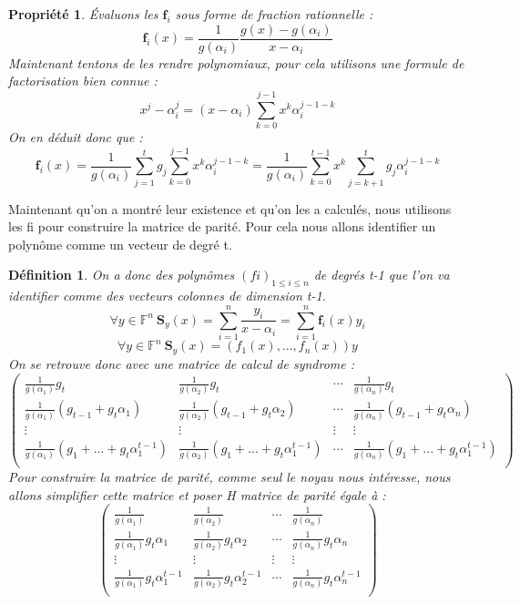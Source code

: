\documentclass{article}
\newtheorem{prop}{Propriété}
\newtheorem{defi}{Définition}
\begin{document}
		\begin{prop}
			Évaluons les  $ \mathbf{f}_{i} $  sous forme de fraction rationnelle :
			$$ \mathbf{f}_{i}(x) = \frac{1}{g(\alpha_{i})} \frac{g(x)-g(\alpha_{i})}{x-\alpha_{i}}  $$ 
			Maintenant tentons de les rendre polynomiaux, pour cela utilisons une formule de factorisation bien connue  :
			$$ x^{j} - \alpha_{i}^{j} = (x-\alpha_{i})\sum_{k=0}^{j-1} x^{k}\alpha_{i}^{j-1-k}$$
			On en déduit donc que :
			$$  \mathbf{f}_{i}(x) = \frac{1}{g(\alpha_{i})} \sum_{j=1}^{t} g_{j}\sum_{k=0}^{j-1} x^{k}\alpha_{i}^{j-1-k} 
			= \frac{1}{g(\alpha_{i})} \sum_{k=0}^{t-1} x^{k}\sum_{j=k+1}^{t} g_{j}\alpha_{i}^{j-1-k}$$
		\end{prop}

		Maintenant qu'on a montré leur existence et qu'on les a calculés, nous utilisons les fi pour construire la matrice de parité.
		Pour cela nous allons identifier un polynôme comme un vecteur de degré t.

		\begin{defi}
			On a donc des polynômes $(fi)_{1\leq i \leq n}$ de degrés t-1 que l'on va identifier comme des vecteurs colonnes de dimension t-1.
			$$ \forall y \in \mathbb{F}^{n} \ \mathbf{S}_{y}(x) = \sum_{i=1}^{n} \frac{y_{i}}{x-\alpha_{i}} = \sum_{i=1}^{n} \mathbf{f}_{i}(x)y_{i}$$
			$$ \forall y \in \mathbb{F}^{n} \  \mathbf{S}_{y}(x) =(f_{1}(x), ... , f_{n}(x))y $$
			On se retrouve donc avec une matrice de calcul de syndrome :
			$$ 
			\begin{pmatrix}
				\frac{1}{g(\alpha_{1})}g_{t} &  \frac{1}{g(\alpha_{2})}g_{t} & \cdots &  \frac{1}{g(\alpha_{n})}g_{t} \\
				\frac{1}{g(\alpha_{1})}(g_{t-1} + g_{t}\alpha_{1}) &  \frac{1}{g(\alpha_{2})}(g_{t-1} + g_{t}\alpha_{2}) & \cdots &  \frac{1}{g(\alpha_{n})}(g_{t-1} + g_{t}\alpha_{n}) \\
				\vdots & \vdots & \vdots & \vdots\\
				\frac{1}{g(\alpha_{1})}(g_{1} + ... +g_{t}\alpha_{1}^{t-1}) &  \frac{1}{g(\alpha_{2})}(g_{1} + ... +g_{t}\alpha_{1}^{t-1}) & \cdots &  \frac{1}{g(\alpha_{n})}(g_{1} + ... +g_{t}\alpha_{1}^{t-1}) \\
			\end{pmatrix}
			$$
			Pour construire la matrice de parité, comme seul le noyau nous intéresse, nous allons simplifier cette matrice et poser H matrice de parité égale à :
			$$
			\begin{pmatrix}
				\frac{1}{g(\alpha_{1})} &  \frac{1}{g(\alpha_{2})} & \cdots &  \frac{1}{g(\alpha_{n})} \\
				\frac{1}{g(\alpha_{1})}g_{t}\alpha_{1} &  \frac{1}{g(\alpha_{2})}g_{t}\alpha_{2} & \cdots &  \frac{1}{g(\alpha_{n})}g_{t}\alpha_{n}\\
				\vdots & \vdots & \vdots & \vdots\\
				\frac{1}{g(\alpha_{1})}g_{t}\alpha_{1}^{t-1} &  \frac{1}{g(\alpha_{2})}g_{t}\alpha_{2}^{t-1} & \cdots &  \frac{1}{g(\alpha_{n})}g_{t}\alpha_{n}^{t-1} \\
			\end{pmatrix}
			$$
		\end{defi}
\end{document}
